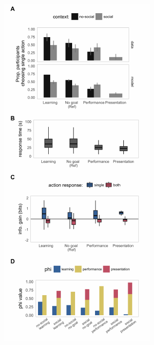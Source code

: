 \documentclass[10pt, letterpaper]{article}
\newenvironment{CodeChunk}{}{}
\begin{document}
\begin{CodeChunk}
\begin{figure}[H]

{\centering \includegraphics[width=0.97\linewidth]{figs/e2_results-1} 

}
\end{figure}
\end{CodeChunk}
\end{document}
